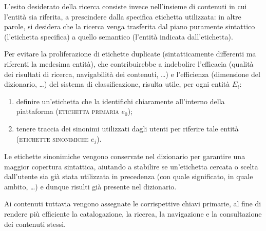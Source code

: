 \documentclass[10pt,a4paper,headinclude,footinclude,hidelinks]{scrreprt} %
\begin{document}

	L'esito desiderato della ricerca consiste invece nell'insieme di contenuti in cui l'entità sia riferita, a prescindere dalla specifica etichetta utilizzata: in altre parole, si desidera che la ricerca venga trasferita dal piano puramente sintattico (l'etichetta specifica) a quello semantico (l'entità indicata dall'etichetta).

	Per evitare la proliferazione di etichette duplicate (sintatticamente differenti ma riferenti la medesima entità), che contribuirebbe a indebolire l'efficacia (qualità dei risultati di ricerca, navigabilità dei contenuti, \ldots) e l'efficienza (dimensione del dizionario, \ldots) del sistema di classificazione, risulta utile, per ogni entità $E_i$:
	\begin{enumerate}
	\item definire un'etichetta che la identifichi chiaramente all'interno della piattaforma (\textsc{etichetta primaria} $e_0$);
	\item tenere traccia dei sinonimi utilizzati dagli utenti per riferire tale entità (\textsc{etichette sinonimiche} $e_j$).
	\end{enumerate}


	Le etichette sinonimiche vengono conservate nel dizionario per garantire una maggior copertura sintattica, aiutando a stabilire se un'etichetta cercata o scelta dall'utente sia già stata utilizzata in precedenza (con quale significato, in quale ambito, \ldots) e dunque risulti già presente nel dizionario.

	Ai contenuti tuttavia vengono assegnate le corrispettive chiavi primarie, al fine di rendere più efficiente la catalogazione, la ricerca, la navigazione e la consultazione dei contenuti stessi.
\end{document}
